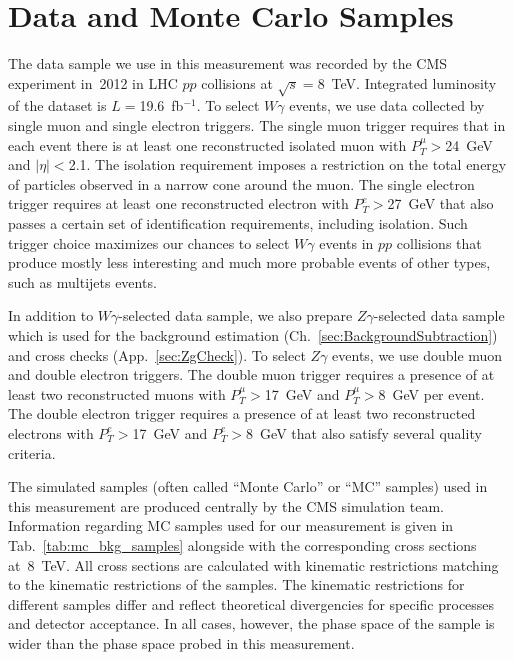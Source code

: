 \section{Data and Monte Carlo Samples}
\label{sec:DataAndMC}

The data sample we use in this measurement was recorded by the CMS experiment in~2012 in LHC $pp$ collisions at $\sqrt{s}=$8~TeV. Integrated luminosity of the dataset is $L=$19.6~fb$^{-1}$. To select $W\gamma$ events, we use data collected by single muon and single electron triggers. The single muon trigger requires that in each event there is at least one reconstructed isolated muon with $P_T^{\mu}>$24~GeV and $|\eta|<$2.1. The isolation requirement imposes a restriction on the total energy of particles observed in a narrow cone around the muon. The single electron trigger requires at least one reconstructed electron with $P_T^{e}>$27~GeV that also passes a certain set of identification requirements, including isolation. Such trigger choice maximizes our chances to select $W\gamma$ events in $pp$ collisions that produce mostly less interesting and much more probable events of other types, such as multijets events.

In addition to $W\gamma$-selected data sample, we also prepare $Z\gamma$-selected data sample which is used for the background estimation (Ch.~\ref{sec:BackgroundSubtraction}) and cross checks (App.~\ref{sec:ZgCheck}). To select $Z\gamma$ events, we use double muon and double electron triggers. The double muon trigger requires a presence of at least two reconstructed muons with $P_T^{\mu}>$17~GeV and $P_T^{\mu}>$8~GeV per event. The double electron trigger requires a presence of at least two reconstructed electrons with $P_T^{e}>$17~GeV and $P_T^{e}>$8~GeV that also satisfy several quality criteria.





The simulated samples (often called ``Monte Carlo'' or ``MC'' samples) used in this measurement are produced centrally by the CMS simulation team. Information regarding MC samples used for our measurement is given in Tab.~\ref{tab:mc_bkg_samples} alongside with the corresponding cross sections at~8~TeV. All cross sections are calculated with kinematic restrictions matching to the kinematic restrictions of the samples. The kinematic restrictions for different samples differ and reflect theoretical divergencies for specific processes and detector acceptance. In all cases, however, the phase space of the sample is wider than the phase space probed in this measurement.

